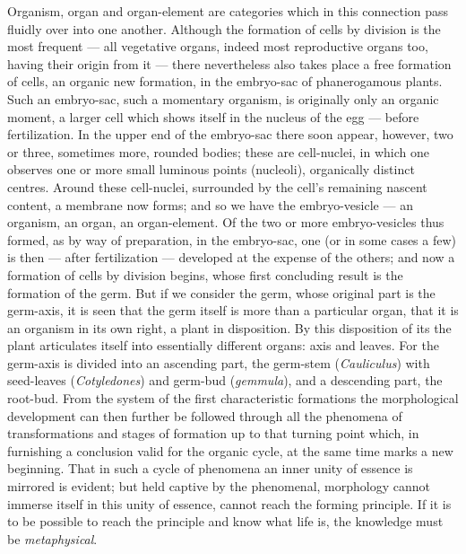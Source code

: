 \documentclass[12pt,a4paper]{book}
\begin{document}
Organism, organ and organ-element are categories which in this connection pass
fluidly over into one another. Although
the formation of cells by division is the most frequent --- all vegetative
organs, indeed most reproductive organs too, having their origin from it ---
there nevertheless also takes place a free formation of cells, an organic new
formation, in the embryo-sac of phanerogamous plants. Such an embryo-sac, such
a momentary organism, is originally only an organic moment, a larger cell which
shows itself in the nucleus of the egg --- before fertilization. In the upper
end of the embryo-sac there soon appear, however, two or three, sometimes more,
rounded bodies; these are cell-nuclei, in which one observes one or more small
luminous points (nucleoli), organically distinct centres. Around these
cell-nuclei, surrounded by the cell's remaining nascent content, a membrane now
forms; and so we have the embryo-vesicle --- an organism, an organ, an
organ-element. Of the two or more embryo-vesicles thus formed, as by way of
preparation, in the embryo-sac, one (or in some cases a few) is then --- after
fertilization --- developed at the expense of the others; and now a formation
of cells by division begins, whose first concluding result is the formation of
the germ. But if we consider the germ, whose original part is the germ-axis, it
is seen that the germ itself is more than a particular organ, that it is an
organism in its own right, a plant in disposition. By this disposition of its
the plant articulates itself into essentially different organs: axis and
leaves. For the germ-axis is divided into an ascending part, the germ-stem
(\textit{Cauliculus}) with seed-leaves (\textit{Cotyledones}) and germ-bud
(\textit{gemmula}), and a descending part, the root-bud. From the system of the
first characteristic formations the morphological development can then further
be followed through all the phenomena of transformations and stages of
formation up to that turning point which, in furnishing a conclusion valid for
the organic cycle, at the same time marks a new beginning. That in such a cycle
of phenomena an inner unity of essence is mirrored is evident; but held captive
by the phenomenal, morphology cannot immerse itself in this unity of essence,
cannot reach the forming principle.
If it is to be possible to reach the principle and know what life is, the
knowledge must be \emph{metaphysical}.
\end{document}
